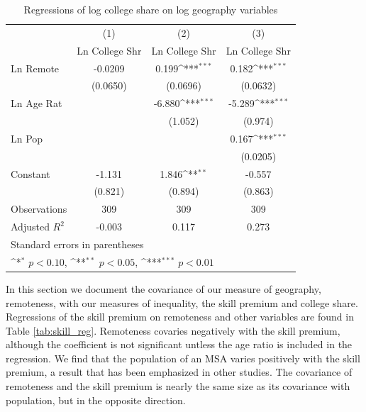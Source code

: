 \documentclass{article}
\begin{document}
\begin{table}
    \centering
    {
    \def\sym#1{\ifmmode^{#1}\else\(^{#1}\)\fi}
    \begin{tabular}{l*{3}{c}}
    \hline\hline
                        &\multicolumn{1}{c}{(1)}&\multicolumn{1}{c}{(2)}&\multicolumn{1}{c}{(3)}\\
                        &\multicolumn{1}{c}{Ln College Shr}&\multicolumn{1}{c}{Ln College Shr}&\multicolumn{1}{c}{Ln College Shr}\\
    \hline
    Ln Remote           &     -0.0209         &       0.199\sym{***}&       0.182\sym{***}\\
                        &    (0.0650)         &    (0.0696)         &    (0.0632)         \\
    [1em]
    Ln Age Rat          &                     &      -6.880\sym{***}&      -5.289\sym{***}\\
                        &                     &     (1.052)         &     (0.974)         \\
    [1em]
    Ln Pop              &                     &                     &       0.167\sym{***}\\
                        &                     &                     &    (0.0205)         \\
    [1em]
    Constant            &      -1.131         &       1.846\sym{**} &      -0.557         \\
                        &     (0.821)         &     (0.894)         &     (0.863)         \\
    \hline
    Observations        &         309         &         309         &         309         \\
    Adjusted \(R^{2}\)  &      -0.003         &       0.117         &       0.273         \\
    \hline\hline
    \multicolumn{4}{l}{\footnotesize Standard errors in parentheses}\\
    \multicolumn{4}{l}{\footnotesize \sym{*} \(p<0.10\), \sym{**} \(p<0.05\), \sym{***} \(p<0.01\)}\\
    \end{tabular}
    }
    \caption{Regressions of log college share on log geography variables}
    \label{tab:col_reg}
\end{table}

In this section we document the covariance of our measure of geography, remoteness, with our measures of inequality, the skill premium and college share.  Regressions of the skill premium on remoteness and other variables are found in Table \ref{tab:skill_reg}.  Remoteness covaries negatively with the skill premium, although the coefficient is not significant untless the age ratio is included in the regression.  We find that the population of an MSA varies positively with the skill premium, a result that has been emphasized in other studies.  The covariance of remoteness and the skill premium is nearly the same size as its covariance with population, but in the opposite direction.
\end{document}
